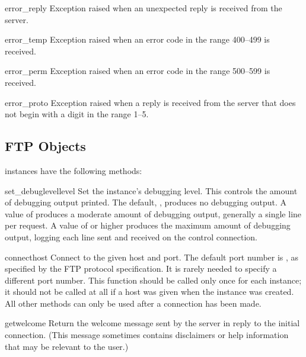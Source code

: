 \begin{excdesc}{error_reply}
Exception raised when an unexpected reply is received from the server.
\end{excdesc}

\begin{excdesc}{error_temp}
Exception raised when an error code in the range 400--499 is received.
\end{excdesc}

\begin{excdesc}{error_perm}
Exception raised when an error code in the range 500--599 is received.
\end{excdesc}

\begin{excdesc}{error_proto}
Exception raised when a reply is received from the server that does
not begin with a digit in the range 1--5.
\end{excdesc}


\subsection{FTP Objects}
\label{ftp-objects}

 instances have the following methods:

\begin{methoddesc}{set_debuglevel}{level}
Set the instance's debugging level.  This controls the amount of
debugging output printed.  The default, , produces no
debugging output.  A value of  produces a moderate amount of
debugging output, generally a single line per request.  A value of
 or higher produces the maximum amount of debugging output,
logging each line sent and received on the control connection.
\end{methoddesc}

\begin{methoddesc}{connect}{host}
Connect to the given host and port.  The default port number is , as
specified by the FTP protocol specification.  It is rarely needed to
specify a different port number.  This function should be called only
once for each instance; it should not be called at all if a host was
given when the instance was created.  All other methods can only be
used after a connection has been made.
\end{methoddesc}

\begin{methoddesc}{getwelcome}{}
Return the welcome message sent by the server in reply to the initial
connection.  (This message sometimes contains disclaimers or help
information that may be relevant to the user.)
\end{methoddesc}

